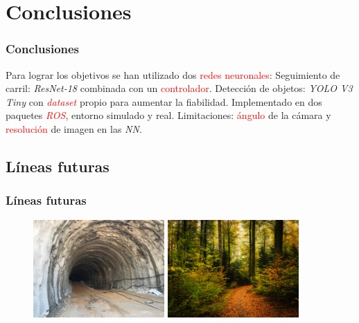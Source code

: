 \documentclass{beamer}
\begin{document}
\section{Conclusiones}
\begin{frame}
	\frametitle{Conclusiones}
	\begin{outline}
		\1 Para lograr los objetivos se han utilizado dos \textcolor{red}{redes neuronales}:
		\2 Seguimiento de carril: \textit{ResNet-18} combinada con un \textcolor{red}{controlador}.
		\2 Detección de objetos: \textit{YOLO V3 Tiny} con \textcolor{red}{\textit{dataset}} propio para aumentar la fiabilidad.
		\1 Implementado en dos paquetes \textcolor{red}{\textit{ROS}}, entorno simulado y real.
		\1 Limitaciones: \textcolor{red}{ángulo} de la cámara y \textcolor{red}{resolución} de imagen en las \textit{NN}.
	\end{outline}
\end{frame}

\subsection{Líneas futuras}
\begin{frame}
	\frametitle{Líneas futuras}
	\begin{figure}
		\centering
		\includegraphics[width=5cm]{figs/tunel}\hspace{0.5cm}
		\includegraphics[width=5cm]{figs/forest}
	\end{figure}
\end{frame}

\begin{frame}[plain]
	\large{\titlepage}
\end{frame}
\end{document}
